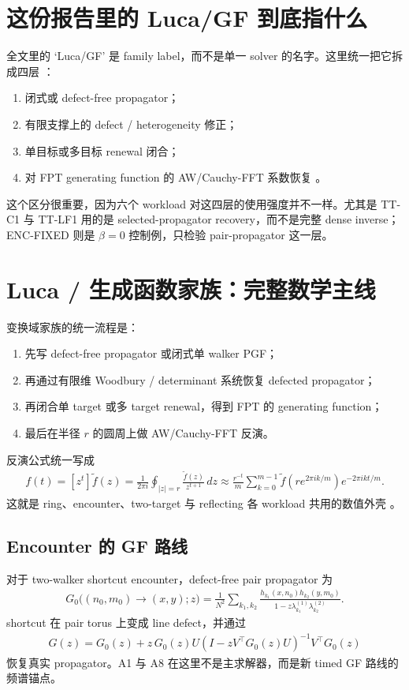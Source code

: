 \documentclass[11pt]{ctexart}
\begin{document}
\section{这份报告里的 Luca/GF 到底指什么}
全文里的 `Luca/GF' 是 family label，而不是单一 solver 的名字。这里统一把它拆成四层 \cite{pre102_062124_2020,prr5_043281_2023,jstat_013201_2023,review_2311_00464_2023}：
\begin{enumerate}[leftmargin=1.5em]
\item 闭式或 defect-free propagator；
\item 有限支撑上的 defect / heterogeneity 修正；
\item 单目标或多目标 renewal 闭合；
\item 对 FPT generating function 的 AW/Cauchy-FFT 系数恢复 \cite{abate_whitt_2006}。
\end{enumerate}
这个区分很重要，因为六个 workload 对这四层的使用强度并不一样。尤其是 TT-C1 与 TT-LF1 用的是 selected-propagator recovery，而不是完整 dense inverse；ENC-FIXED 则是 $\beta=0$ 控制例，只检验 pair-propagator 这一层。
\section{Luca / 生成函数家族：完整数学主线}
变换域家族的统一流程是：
\begin{enumerate}[leftmargin=1.5em]
\item 先写 defect-free propagator 或闭式单 walker PGF；
\item 再通过有限维 Woodbury / determinant 系统恢复 defected propagator；
\item 再闭合单 target 或多 target renewal，得到 FPT 的 generating function；
\item 最后在半径 $r$ 的圆周上做 AW/Cauchy-FFT 反演。
\end{enumerate}
反演公式统一写成
\begin{align}
f(t)=[z^t]\widetilde f(z)=\frac{1}{2\pi i}\oint_{|z|=r}\frac{\widetilde f(z)}{z^{t+1}}\,dz
\approx \frac{r^{-t}}{m}\sum_{k=0}^{m-1}\widetilde f\!\left(re^{2\pi i k/m}\right)e^{-2\pi i kt/m}.
\end{align}
这就是 ring、encounter、two-target 与 reflecting 各 workload 共用的数值外壳 \cite{abate_whitt_2006}。
\subsection{Encounter 的 GF 路线}
对于 two-walker shortcut encounter，defect-free pair propagator 为
\begin{align}
G_0\big((n_0,m_0)\to(x,y);z\big)=\frac{1}{N^2}\sum_{k_1,k_2}\frac{h_{k_1}(x,n_0)h_{k_2}(y,m_0)}{1-z\lambda_{k_1}^{(1)}\lambda_{k_2}^{(2)}}.
\end{align}
shortcut 在 pair torus 上变成 line defect，并通过
\begin{align}
G(z)=G_0(z)+z\,G_0(z)U\left(I-zV^{\top}G_0(z)U\right)^{-1}V^{\top}G_0(z)
\end{align}
恢复真实 propagator。A1 与 A8 在这里不是主求解器，而是新 timed GF 路线的频谱锚点。
\end{document}

